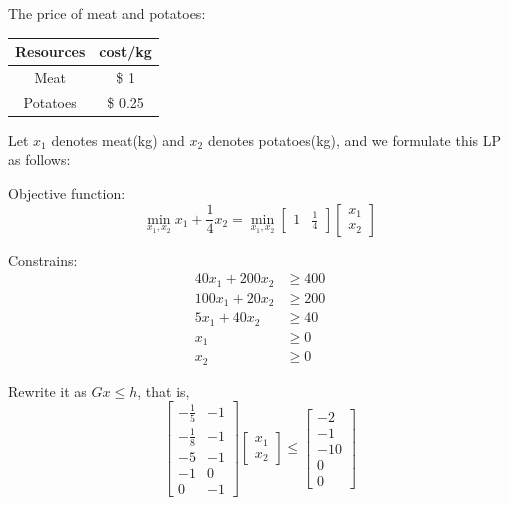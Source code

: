 \vspace{0.3cm}
The price of meat and potatoes:
\begin{center}
	\begin{tabular}{|c|c|}
		\hline 
		Resources&cost/kg\\
		\hline  
		Meat &\$ 1\\
		\hline 
		Potatoes &\$ 0.25\\
		\hline 
	\end{tabular}
\end{center}

Let $x_1$ denotes meat(kg) and $x_2$ denotes potatoes(kg), and we formulate this LP as follows:

Objective function:
\begin{equation*}
	\min_{x_1, x_2} x_1 + \frac{1}{4}x_2 = 
	\min_{x_1, x_2}
	\begin{bmatrix}
		1 & \frac{1}{4}
	\end{bmatrix}
	\begin{bmatrix}
		x_1\\
		x_2
	\end{bmatrix}
\end{equation*}

Constrains:
\begin{align*}
	40x_1 + 200x_2 &\geq 400\\
	100x_1 + 20x_2 &\geq 200\\
	5x_1 + 40x_2 &\geq 40\\
	x_1 &\geq 0\\
	x_2 &\geq 0
\end{align*}


Rewrite it as $Gx\leq h$, that is,
\begin{equation*}
	\begin{bmatrix}
		-\frac{1}{5} & -1\\
		-\frac{1}{8} & -1\\
		-5 & -1\\
		-1 & 0\\
		0 & -1
	\end{bmatrix}
	\begin{bmatrix}
		x_1\\
		x_2
	\end{bmatrix}\leq
	\begin{bmatrix}
		-2\\
		-1\\
		-10\\
		0\\
		0
	\end{bmatrix}
\end{equation*}

